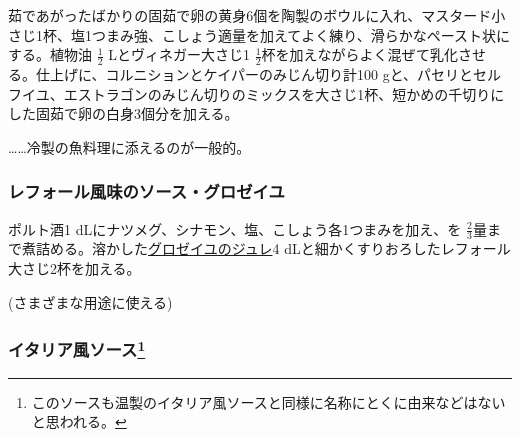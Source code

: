 \begin{recette}


茹であがったばかりの固茹で卵の黄身6個を陶製のボウルに入れ、マスタード小さじ1杯、塩1つまみ強、こしょう適量を加えてよく練り、滑らかなペースト状にする。植物油
\(\frac{1}{2}\) Lとヴィネガー大さじ1
\(\frac{1}{2}\)杯を加えながらよく混ぜて乳化させる。仕上げに、コルニションとケイパーのみじん切り計100
gと、パセリとセルフイユ、エストラゴンのみじん切りのミックスを大さじ1杯、短かめの千切りにした固茹で卵の白身3個分を加える。

\ldots{}\ldots{}冷製の魚料理に添えるのが一般的。

\atoaki{}

\hypertarget{sauce-groseilles-au-raifort}{%
\subsubsection{レフォール風味のソース・グロゼイユ}\label{sauce-groseilles-au-raifort}}



ポルト酒1 dLにナツメグ、シナモン、塩、こしょう各1つまみを加え、を
\(\frac{2}{3}\)量まで煮詰める。溶かした\protect\hyperlink{}{グロゼイユのジュレ}4
dLと細かくすりおろしたレフォール大さじ2杯を加える。

(さまざまな用途に使える)

\atoaki{}

\hypertarget{sauce-italienne-froide}{%
\subsubsection[イタリア風ソース]{\texorpdfstring{イタリア風ソース\footnote{このソースも温製のイタリア風ソースと同様に名称にとくに由来などはないと思われる。}}{イタリア風ソース}}\label{sauce-italienne-froide}}


\end{recette}

